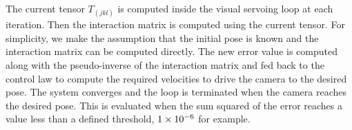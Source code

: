 The current tensor $T_{(jkl)}$ is computed inside the visual servoing loop at each iteration. Then the interaction matrix is computed using the current tensor. For simplicity, we make the assumption that the initial pose is known and the interaction matrix can be computed directly. The new error value is computed along with the pseudo-inverse of the interaction matrix and fed back to the control law to compute the required velocities to drive the camera to the desired pose. The system converges and the loop is terminated when the camera reaches the desired pose. This is evaluated when the sum squared of the error reaches a value less than a defined threshold, $1 \times 10^{-6}$ for example.
